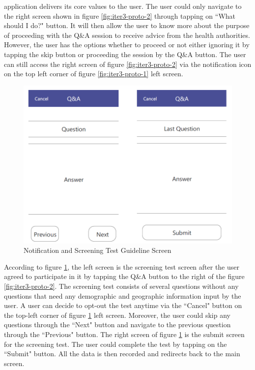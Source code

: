 \begin{enumerate}[a)]
          application delivers its core values to the user. The user could only navigate to the right screen shown
          in figure \ref{fig:iter3-proto-2} through tapping on ``What should I do?" button. It will then allow the user to know more
          about the purpose of proceeding with the Q\&A session to receive advice from the health authorities.
          However, the user has the options whether to proceed or not either ignoring it by tapping the skip
          button or proceeding the session by the Q\&A button. The user can still access the right screen of
          figure \ref{fig:iter3-proto-2} via the notification icon on the top left corner of figure \ref{fig:iter3-proto-1} left screen.
          \begin{figure}[H]
            \centering
            \includegraphics[scale=1]{img/prototype/iter3-proto-3.png}
            \caption{Notification and Screening Test Guideline Screen}
            \label{fig:iter3-proto-3}
          \end{figure}
          According to figure \ref{fig:iter3-proto-3}, the left screen is the screening test screen after the user agreed to participate in it by tapping the Q\&A button to the right of the figure \ref{fig:iter3-proto-2}. The screening test consists of several questions without any questions that need any demographic and geographic information input by the user. A user can decide to opt-out the test anytime via the ``Cancel" button on the top-left corner of figure \ref{fig:iter3-proto-3} left screen. Moreover, the user could skip any questions through the ``Next" button and navigate to the previous question through the ``Previous" button. The right screen of figure \ref{fig:iter3-proto-3} is the submit screen for the screening test. The user could complete the test by tapping on the ``Submit" button. All the data is then recorded and redirects back to the main screen.

\end{enumerate}

